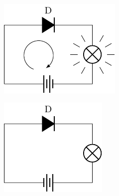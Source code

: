 \begin{figure}[htbp]
	\centering
	\begin{subfigure}{0.4\linewidth}
		\centering
		\includegraphics{fig/B/8-26a.pdf}
		\caption{}\label{fig_B_8-26a}
	\end{subfigure}
	\hfil
	\begin{subfigure}{0.4\linewidth}
		\centering
		\includegraphics{fig/B/8-26b.pdf}
		\caption{}\label{fig_B_8-26b}
	\end{subfigure}
	\caption{}\label{fig_B_8-26}
\end{figure}


